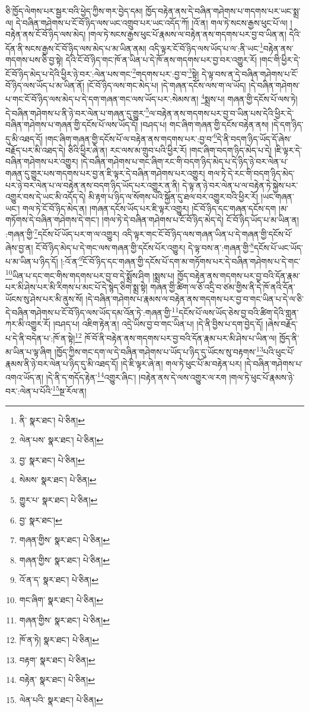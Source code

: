 ཅི་ཁྱོད་ལེགས་པར་སྦྱར་བའི་ཕྱེད་ཀྱིས་གར་བྱེད་དམ། ཁྱོད་བརྟེན་ནས་དེ་བཞིན་གཤེགས་པ་གདགས་པར་ཡང་སྨྲ་ལ། དེ་བཞིན་གཤེགས་པ་ངོ་བོ་ཉིད་ལས་ཡང་འགྲུབ་པར་ཡང་འདོད་ཀོ། །འོ་ན། གལ་ཏེ་སངས་རྒྱས་ཕུང་པོ་ལ། །བརྟེན་ནས་ངོ་བོ་ཉིད་ལས་མེད། །གལ་ཏེ་སངས་རྒྱས་ཕུང་པོ་རྣམས་ལ་བརྟེན་ནས་གདགས་པར་བྱ་བ་ཡིན་ན། དེའི་དོན་ནི་སངས་རྒྱས་ངོ་བོ་ཉིད་ལས་མེད་པ་མ་ཡིན་ནམ། འདི་ལྟར་ངོ་བོ་ཉིད་ལས་ཡོད་པ་ལ་:ནི་ཡང་\footnote{ནི་  སྣར་ཐང་།  པེ་ཅིན། }བརྟེན་ནས་གདགས་པས་ཅི་བྱ་སྟེ། དེའི་ངོ་བོ་ཉིད་གང་ཁོ་ན་ཡིན་པ་དེ་ཁོ་ནས་གདགས་པར་བྱ་བར་འགྱུར་རོ། །གང་གི་ཕྱིར་དེ་ངོ་བོ་ཉིད་མེད་པ་དེའི་ཕྱིར་ཉེ་བར་:ལེན་པས་གང་\footnote{ལེན་པས་  སྣར་ཐང་།  པེ་ཅིན། }གདགས་པར་:བྱ་བ་\footnote{བྱ་  སྣར་ཐང་།  པེ་ཅིན། }སྟེ། དེ་ལྟ་བས་ན་དེ་བཞིན་གཤེགས་པ་ངོ་བོ་ཉིད་ལས་ཡོད་པ་མ་ཡིན་ནོ། །ངོ་བོ་ཉིད་ལས་གང་མེད་པ། །དེ་གཞན་དངོས་ལས་ག་ལ་ཡོད། །དེ་བཞིན་གཤེགས་པ་གང་ངོ་བོ་ཉིད་ལས་མེད་པ་དེ་དག་གཞན་གང་ལས་ཡོད་པར་:སེམས་ན། \footnote{སེམས་  སྣར་ཐང་།  པེ་ཅིན། }སྨྲས་པ། གཞན་གྱི་དངོས་པོ་ལས་ཏེ། དེ་བཞིན་གཤེགས་པ་ནི་ཉེ་བར་ལེན་པ་གཞན་དུ་གྱུར་\footnote{གྱུར་པ་  སྣར་ཐང་།  པེ་ཅིན། }ལ་བརྟེན་ནས་གདགས་པར་བྱ་བ་ཡིན་པས་དེའི་ཕྱིར་དེ་བཞིན་གཤེགས་པ་གཞན་གྱི་དངོས་པོ་ལས་ཡོད་དོ། །བཤད་པ། གང་ཞིག་གཞན་གྱི་དངོས་བརྟེན་ནས། །དེ་དག་ཉིད་དུ་མི་འཐད་དོ། །གང་ཞིག་གཞན་གྱི་དངོས་པོ་ལ་བརྟེན་ནས་གདགས་པར་:བྱ་བ་\footnote{བྱ་  སྣར་ཐང་། }དེ་ནི་བདག་ཉིད་ཡོད་དོ་ཞེས་བརྗོད་པར་མི་འཐད་དེ། ཅིའི་ཕྱིར་ཞེ་ན། རང་ལས་མ་གྲུབ་པའི་ཕྱིར་རོ། །གང་ཞིག་བདག་ཉིད་མེད་པ་དེ། །ཇི་ལྟར་དེ་བཞིན་གཤེགས་པར་འགྱུར། །དེ་བཞིན་གཤེགས་པ་གང་ཞིག་རང་གི་བདག་ཉིད་མེད་པ་དེ་ཉིད་ཉེ་བར་ལེན་པ་གཞན་དུ་གྱུར་པས་གདགས་པར་བྱ་ན་ཇི་ལྟར་དེ་བཞིན་གཤེགས་པར་འགྱུར། གལ་ཏེ་དེ་རང་གི་བདག་ཉིད་མེད་པར་ཉེ་བར་ལེན་པ་ལ་བརྟེན་ནས་བདག་ཉིད་ཡོད་པར་འགྱུར་ན་ནི། དེ་ལྟ་ན་ཉེ་བར་ལེན་པ་ལ་བརྟེན་ཏེ་སྐྱེས་པར་འགྱུར་བས་དེ་ཡང་མི་འདོད་དེ། མི་རྟག་པ་ཉིད་ལ་སོགས་པའི་སྐྱོན་དུ་ཐལ་བར་འགྱུར་བའི་ཕྱིར་རོ། །ཡང་གཞན་ཡང་། གལ་ཏེ་ངོ་བོ་ཉིད་མེད་ན། །གཞན་དངོས་ཡོད་པར་ཇི་ལྟར་འགྱུར། །ངོ་བོ་ཉིད་དང་གཞན་དངོས་དག །མ་གཏོགས་དེ་བཞིན་གཤེགས་དེ་གང་། །གལ་ཏེ་དེ་བཞིན་གཤེགས་པ་ངོ་བོ་ཉིད་མེད་དེ། ངོ་བོ་ཉིད་ཡོད་པ་མ་ཡིན་ན། :གཞན་གྱི་\footnote{གཞན་གྱིས་  སྣར་ཐང་།  པེ་ཅིན། }དངོས་པོ་ཡོད་པར་ག་ལ་འགྱུར། འདི་ལྟར་གང་ངོ་བོ་ཉིད་ལས་གཞན་ཡིན་པ་དེ་གཞན་གྱི་དངོས་པོ་ཞེས་བྱ་ན། ངོ་བོ་ཉིད་མེད་པ་དེ་གང་ལས་གཞན་གྱི་དངོས་པོར་འགྱུར། དེ་ལྟ་བས་ན་:གཞན་གྱི་\footnote{གཞན་གྱིས་  སྣར་ཐང་།  པེ་ཅིན། }དངོས་པོ་ཡང་ཡོད་པ་མ་ཡིན་པ་ཉིད་དོ། །:འོ་ན་\footnote{འོ་ན་ད་  སྣར་ཐང་།  པེ་ཅིན། }ངོ་བོ་ཉིད་དང་གཞན་གྱི་དངོས་པོ་དག་མ་གཏོགས་པར་དེ་བཞིན་གཤེགས་པ་དེ་གང་\footnote{གང་ཞིག་  སྣར་ཐང་།  པེ་ཅིན། }ཡིན་པ་དང་གང་གིས་གདགས་པར་བྱ་བ་དེ་སྨྲོས་ཤིག །སྨྲས་པ། ཁྱོད་བརྟེན་ནས་གདགས་པར་བྱ་བའི་དོན་རྣམ་པར་མི་ཤེས་པར་མི་རིགས་པ་མང་པོ་དེ་སྙེད་ཅིག་སྨྲ་སྟེ། གཞན་གྱི་ཚིག་ལ་ཅོ་འདྲི་བ་ཙམ་གྱིས་ནི་དེ་ཁོ་ནའི་དོན་ཡོངས་སུ་ཤེས་པར་མི་ནུས་སོ། །དེ་བཞིན་གཤེགས་པ་རྣམས་ལ་བརྟེན་ནས་གདགས་པར་བྱ་བ་གང་ཡིན་པ་དེ་ལ་ཅི་དེ་བཞིན་གཤེགས་པ་ངོ་བོ་ཉིད་ལས་ཡོད་དམ་འོན་ཏེ་:གཞན་གྱི་\footnote{གཞན་གྱིས་  སྣར་ཐང་།  པེ་ཅིན། }དངོས་པོ་ལས་ཡོད་ཅེས་བྱ་བའི་ཚིག་དེའི་གླན་ཀར་མི་འགྱུར་རོ། །བཤད་པ། འཇིག་རྟེན་ན། འདྲེ་ཡིས་བྱ་བ་གང་ཡིན་པ། །དེ་ནི་བྱིས་པ་དག་བྱེད་དོ། །ཞེས་བརྗོད་པ་དེ་ནི་བདེན་པ་:ཁོ་ན་སྟེ།\footnote{ཁོ་ན་ཏེ།  སྣར་ཐང་།  པེ་ཅིན། } ཁོ་བོ་ནི་བརྟེན་ནས་གདགས་པར་བྱ་བའི་དོན་རྣམ་པར་མི་ཤེས་པ་ཡིན་ལ། ཁྱོད་ནི་མ་ཡིན་པ་ལྟ་ཞིག །ཁྱོད་ཀྱིས་གང་དག་ལ་དེ་བཞིན་གཤེགས་པ་ཡོད་པ་ཉིད་དུ་ཡོངས་སུ་བརྟགས་\footnote{བརྟག་  སྣར་ཐང་།  པེ་ཅིན། }པའི་ཕུང་པོ་རྣམས་ནི་ཉེ་བར་ལེན་པ་ཉིད་དུ་མི་འཐད་དོ། །དེ་ཇི་ལྟར་ཞེ་ན། གལ་ཏེ་ཕུང་པོ་མ་བརྟེན་པར། །དེ་བཞིན་གཤེགས་པ་འགའ་ཡོད་ན། །དེ་ནི་ད་གདོད་རྟེན་\footnote{བརྟེན་  སྣར་ཐང་།  པེ་ཅིན། }འགྱུར་ཞིང་། །བརྟེན་ནས་དེ་ལས་འགྱུར་ལ་རག །གལ་ཏེ་ཕུང་པོ་རྣམས་ཉེ་བར་:ལེན་པ་པོའི་\footnote{ལེན་པའི་  སྣར་ཐང་།  པེ་ཅིན། }སྔ་རོལ་ན། 